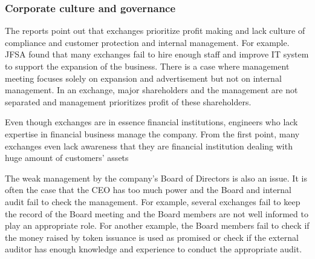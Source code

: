 \subsubsection{Corporate culture and governance}
The reports point out that exchanges prioritize profit making and lack culture of compliance and customer protection and internal management. For example. JFSA found that many exchanges fail to hire enough staff and improve IT system to support the expansion of the business. There is a case where management meeting focuses solely on expansion and advertisement but not on internal management. In an exchange, major shareholders and the management are not separated and management prioritizes profit of these shareholders.

Even though exchanges are in essence financial institutions, engineers who lack expertise in financial business manage the company. From the first point, many exchanges even lack awareness that they are financial institution dealing with huge amount of customers' assets%

The weak management by the company's Board of Directors is also an issue. It is often the case that the CEO has too much power and the Board and internal audit fail to check the management. For example, several exchanges fail to keep the record of the Board meeting and the Board members are not well informed to play an appropriate role. For another example, the Board members fail to check if the money raised by token issuance is used as promised or check if the external auditor has enough knowledge and experience to conduct the appropriate audit.
